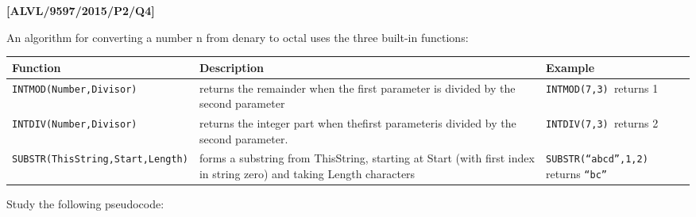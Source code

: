 \item \textbf{{[}ALVL/9597/2015/P2/Q4{]} }

An algorithm for converting a number n from denary to octal uses the
three built-in functions: 
\begin{center}
\begin{tabular}{|l|>{\raggedright}p{}|>{\raggedright}p{}|}
\hline 
\texttt{\hspace{0.01\columnwidth}}Function & \texttt{\hspace{0.01\columnwidth}}Description & \texttt{\hspace{0.01\columnwidth}}Example\tabularnewline
\hline 
\texttt{INTMOD(Number,Divisor)} & returns the remainder when the first parameter is divided by the second
parameter & \texttt{INTMOD(7,3) }returns 1\tabularnewline
\hline 
\texttt{INTDIV(Number,Divisor)} & returns the integer part when thefirst parameteris divided by the
second parameter. & \texttt{INTDIV(7,3) }returns 2\tabularnewline
\hline 
\texttt{SUBSTR(ThisString,Start,Length)} & forms a substring from ThisString, starting at Start (with first index
in string zero) and taking Length characters & \texttt{SUBSTR(``abcd'',1,2)} returns \texttt{``bc''}\tabularnewline
\hline 
\end{tabular}
\par\end{center}

Study the following pseudocode: 

